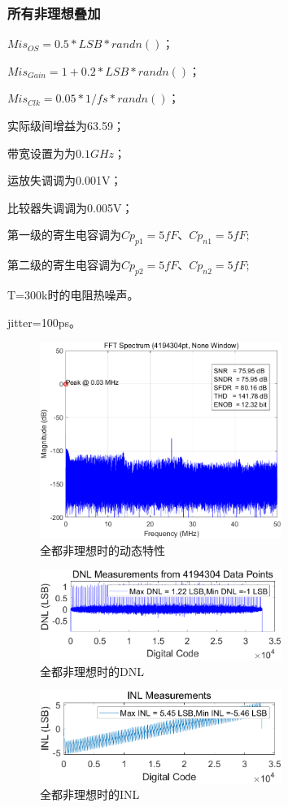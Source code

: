 \documentclass[cs4size,a4paper]{ctexart}
\numberwithin{equation}{section}
\numberwithin{table}{section}
\numberwithin{figure}{section}
\begin{document}
\subsubsection{所有非理想叠加}
$Mis_{OS} = 0.5 * LSB * randn()$；

$Mis_{Gain} = 1 + 0.2 * LSB * randn()$；

$Mis_{Clk} = 0.05 * 1/fs * randn()$；

实际级间增益为63.59；

带宽设置为为$0.1GHz$；

运放失调调为0.001V；

比较器失调调为0.005V；

第一级的寄生电容调为$Cp_{p1}  = 5fF $、$ Cp_{n1} = 5fF;$ 

第二级的寄生电容调为$Cp_{p2}  = 5fF $、$ Cp_{n2} = 5fF;$ 

T=300k时的电阻热噪声。

jitter=100ps。
		\begin{figure}[H]
			\centering
			\includegraphics[width=0.7\textwidth]{pic/noideal/DFT.png}
			\caption{全都非理想时的动态特性} 
		\end{figure}

		\begin{figure}[H]
			\centering
			\includegraphics[width=0.7\textwidth]{pic/noideal/DNL.png}
			\caption{全都非理想时的DNL} 
		\end{figure}

		\begin{figure}[H]
			\centering
			\includegraphics[width=0.7\textwidth]{pic/noideal/INL.png}
			\caption{全都非理想时的INL} 
		\end{figure}
		
\end{document}
